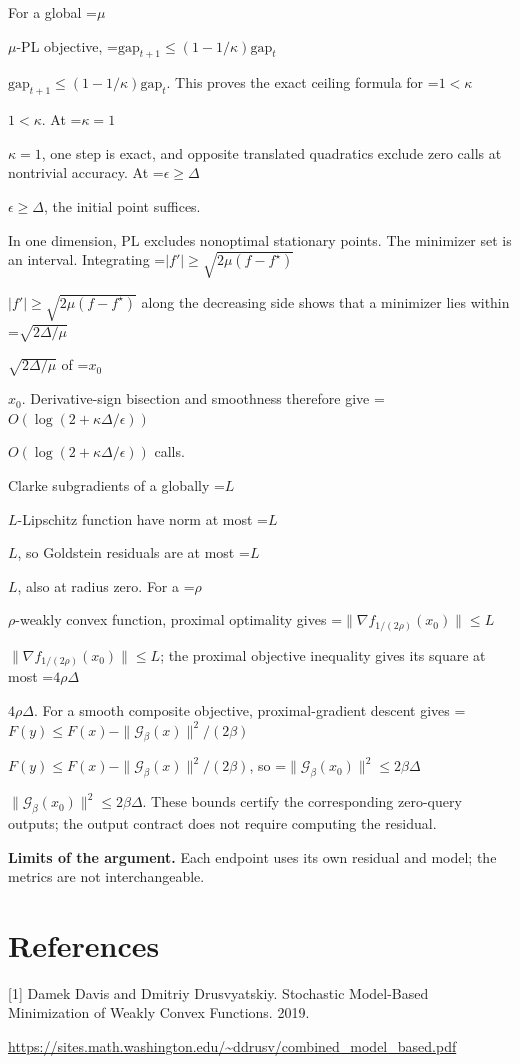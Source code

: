 \documentclass[10pt,a4paper]{article}
\newcommand{\AtlasMath}[1]{\par\begingroup\centering\setbox0=\hbox{$\displaystyle #1$}\ifdim\wd0>1.4\linewidth\typeout{ATLAS WIDE FORMULA: \the\wd0}\fi\ifdim\wd0>\linewidth\resizebox{\linewidth}{!}{\box0}\else\box0\fi\par\endgroup}
\newcommand{\AtlasInlineMath}[1]{\begingroup\setbox0=\hbox{$#1$}\ifdim\wd0>.4\linewidth\endgroup\AtlasMath{#1}\else\endgroup$#1$\fi}
\begin{document}
For a global \AtlasInlineMath{\mu}-PL objective,
\AtlasInlineMath{\mathrm{gap}_{t+1}\le(1-1/\kappa)\mathrm{gap}_t}.
This proves the exact ceiling formula for \AtlasInlineMath{1<\kappa}. At \AtlasInlineMath{\kappa=1}, one step is exact, and opposite translated quadratics exclude zero calls at nontrivial accuracy. At \AtlasInlineMath{\epsilon\ge\Delta}, the initial point suffices.

In one dimension, PL excludes nonoptimal stationary points. The minimizer set is an interval. Integrating
\AtlasInlineMath{|f'|\ge\sqrt{2\mu(f-f^\star)}}
along the decreasing side shows that a minimizer lies within \AtlasInlineMath{\sqrt{2\Delta/\mu}} of \AtlasInlineMath{x_0}. Derivative-sign bisection and smoothness therefore give \AtlasInlineMath{O(\log(2+\kappa\Delta/\epsilon))} calls.

Clarke subgradients of a globally \AtlasInlineMath{L}-Lipschitz function have norm at most \AtlasInlineMath{L}, so Goldstein residuals are at most \AtlasInlineMath{L}, also at radius zero. For a \AtlasInlineMath{\rho}-weakly convex function, proximal optimality gives
\AtlasInlineMath{\|\nabla f_{1/(2\rho)}(x_0)\|\le L}; the proximal objective inequality gives its square at most \AtlasInlineMath{4\rho\Delta}.
For a smooth composite objective, proximal-gradient descent gives
\AtlasInlineMath{F(y)\le F(x)-\|\mathcal G_\beta(x)\|^2/(2\beta)},
so \AtlasInlineMath{\|\mathcal G_\beta(x_0)\|^2\le2\beta\Delta}.
These bounds certify the corresponding zero-query outputs; the output contract does not require computing the residual.

\textbf{Limits of the argument.} Each endpoint uses its own residual and model; the metrics are not interchangeable.

\section{References}
[1] Damek Davis and Dmitriy Drusvyatskiy. Stochastic Model-Based Minimization of Weakly Convex Functions. 2019.

\url{https://sites.math.washington.edu/~ddrusv/combined_model_based.pdf}
\end{document}
